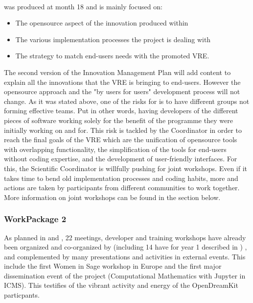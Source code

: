\documentclass{deliverablereport}
\begin{document}

\paragraph{}

 was produced at month 18 and is mainly focused on: 

\begin{itemize}
\item{The opensource aspect of the innovation produced within \ODK}
\item{The various implementation processes the project is dealing with}
\item{The strategy to match end-users needs with the promoted VRE}.
\end{itemize}

  The second version of the Innovation Management Plan will add content to explain all the
  innovations that the VRE is bringing to end-users. However the opensource approach and
  the "by users for users" development process will not change.  As it was stated above,
  one of the risks for \ODK is to have different groups not forming effective teams. Put
  in other words, having developers of the different pieces of software working solely for
  the benefit of the programme they were initially working on and for. This risk is
  tackled by the Coordinator in order to reach the final goals of the VRE which are the
  unification of opensource tools with overlapping functionality, the simplification of
  the tools for end-users without coding expertise, and the development of user-friendly
  interfaces. For this, the Scientific Coordinator is willfully pushing for joint
  workshops. Even if it takes time to bend old implementation processes and coding habits,
  more and actions are taken by \ODK participants from different communities to work
  together. More information on joint workshops can be found in the section below.


  \subsubsection{WorkPackage 2}

  As planned in  and
  , 22 meetings, developer and training workshops have already
  been organized and co-organized by \ODK (including 14 have for year 1 described in ) , and complemented by many
  presentations and activities in external events. This include the first Women in Sage workshop in Europe and the
  first major dissemination event of the project (Computational Mathematics with Jupyter in ICMS). This testifies
  of the vibrant activity and energy of the OpenDreamKit particpants.
  
\end{document}
